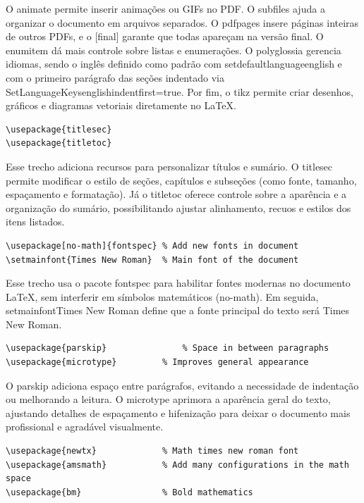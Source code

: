 O animate permite inserir animações ou GIFs no PDF. O subfiles ajuda a organizar o documento em arquivos separados. O pdfpages insere páginas inteiras de outros PDFs, e o [final] garante que todas apareçam na versão final. O enumitem dá mais controle sobre listas e enumerações. O polyglossia gerencia idiomas, sendo o inglês definido como padrão com setdefaultlanguage{english} e com o primeiro parágrafo das seções indentado via SetLanguageKeys{english}{indentfirst=true}. Por fim, o tikz permite criar desenhos, gráficos e diagramas vetoriais diretamente no LaTeX.

\begin{lstlisting}[firstnumber=last]
\usepackage{titlesec}
\usepackage{titletoc}
\end{lstlisting}

Esse trecho adiciona recursos para personalizar títulos e sumário. O titlesec permite modificar o estilo de seções, capítulos e subseções (como fonte, tamanho, espaçamento e formatação). Já o titletoc oferece controle sobre a aparência e a organização do sumário, possibilitando ajustar alinhamento, recuos e estilos dos itens listados.

\begin{lstlisting}[firstnumber=last]
\usepackage[no-math]{fontspec} % Add new fonts in document
\setmainfont{Times New Roman}  % Main font of the document
\end{lstlisting}

Esse trecho usa o pacote fontspec para habilitar fontes modernas no documento LaTeX, sem interferir em símbolos matemáticos (no-math). Em seguida, setmainfont{Times New Roman} define que a fonte principal do texto será Times New Roman.

\begin{lstlisting}[firstnumber=last]
\usepackage{parskip}		       % Space in between paragraphs
\usepackage{microtype} 	       % Improves general appearance
\end{lstlisting}

O parskip adiciona espaço entre parágrafos, evitando a necessidade de indentação ou melhorando a leitura. O microtype aprimora a aparência geral do texto, ajustando detalhes de espaçamento e hifenização para deixar o documento mais profissional e agradável visualmente.

\begin{lstlisting}[firstnumber=last]
\usepackage{newtx}             % Math times new roman font
\usepackage{amsmath}           % Add many configurations in the math space 
\usepackage{bm}                % Bold mathematics 
\end{lstlisting}

